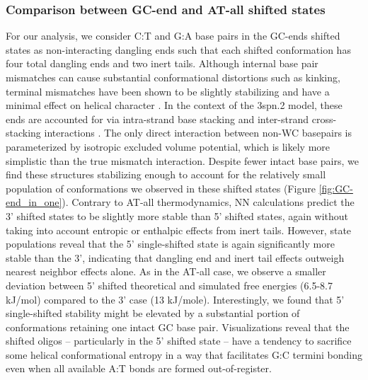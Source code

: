 \documentclass[journal=jpcbfk,manuscript=article]{achemso}
\begin{document}
\subsubsection{Comparison between GC-end and AT-all shifted states}

For our analysis, we consider C:T and G:A base pairs in the GC-ends shifted states as non-interacting dangling ends such that each shifted conformation has four total dangling ends and two inert tails. Although internal base pair mismatches can cause substantial conformational distortions such as kinking, terminal mismatches have been shown to be slightly stabilizing and have a minimal effect on helical character \citep{Santalucia2004TM, DiMichele2014EffectHybridization}. In the context of the 3spn.2 model, these ends are accounted for via intra-strand base stacking and inter-strand cross-stacking interactions \citep{Hinckley2013AnHybridization}. The only direct interaction between non-WC basepairs is parameterized by isotropic excluded volume potential, which is likely more simplistic than the true mismatch interaction. Despite fewer intact base pairs, we find these structures stabilizing enough to account for the relatively small population of conformations we observed in these shifted states (Figure \ref{fig:GC-end_in_one}). Contrary to AT-all thermodynamics, NN calculations predict the 3' shifted states to be slightly more stable than 5' shifted states, again without taking into account entropic or enthalpic effects from inert tails. However, state populations reveal that the 5' single-shifted state is again significantly more stable than the 3', indicating that dangling end and inert tail effects outweigh nearest neighbor effects alone. As in the AT-all case, we observe a smaller deviation between 5' shifted theoretical and simulated free energies (6.5-8.7 kJ/mol) compared to the 3' case (13 kJ/mole). Interestingly, we found that 5' single-shifted stability might be elevated by a substantial portion of conformations retaining one intact GC base pair. Visualizations reveal that the shifted oligos -- particularly in the 5' shifted state -- have a tendency to sacrifice some helical conformational entropy in a way that facilitates G:C termini bonding even when all available A:T bonds are formed out-of-register.
\end{document}
